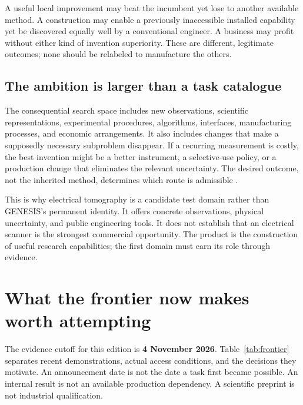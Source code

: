 \documentclass[11pt,letterpaper]{article}
\theoremstyle{remark}\newtheorem{remark}{Remark}[section]
\begin{document}
A useful local improvement may beat the incumbent yet lose to another available method. A construction may enable a previously inaccessible installed capability yet be discovered equally well by a conventional engineer. A business may profit without either kind of invention superiority. These are different, legitimate outcomes; none should be relabeled to manufacture the others.

\subsection{The ambition is larger than a task catalogue}
The consequential search space includes new observations, scientific representations, experimental procedures, algorithms, interfaces, manufacturing processes, and economic arrangements. It also includes changes that make a supposedly necessary subproblem disappear. If a recurring measurement is costly, the best invention might be a better instrument, a selective-use policy, or a production change that eliminates the relevant uncertainty. The desired outcome, not the inherited method, determines which route is admissible \citep{transform,notes29}.

This is why electrical tomography is a candidate test domain rather than GENESIS's permanent identity. It offers concrete observations, physical uncertainty, and public engineering tools. It does not establish that an electrical scanner is the strongest commercial opportunity. The product is the construction of useful research capabilities; the first domain must earn its role through evidence.

\section{What the frontier now makes worth attempting}
\label{sec:frontier}
The evidence cutoff for this edition is \textbf{4 November 2026}. Table~\ref{tab:frontier} separates recent demonstrations, actual access conditions, and the decisions they motivate. An announcement date is not the date a task first became possible. An internal result is not an available production dependency. A scientific preprint is not industrial qualification.
\end{document}
